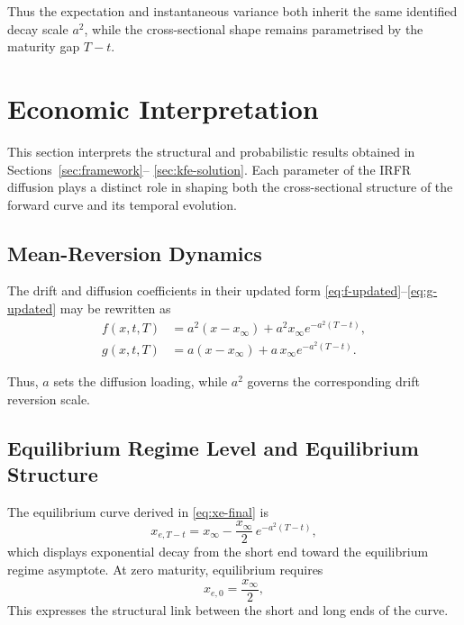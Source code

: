 \documentclass[12pt]{article}
\theoremstyle{statementstyle}
\begin{document}
Thus the expectation and instantaneous variance both inherit the same
identified decay scale \(a^{2}\), while the cross-sectional shape remains
parametrised by the maturity gap \(T-t\).
\section{Economic Interpretation}
\label{sec:econ}

This section interprets the structural and probabilistic results
obtained in Sections~\ref{sec:framework}--%
\ref{sec:kfe-solution}. Each parameter of the IRFR diffusion plays a
distinct role in shaping both the cross-sectional structure of the
forward curve and its temporal evolution.

\subsection{Mean-Reversion Dynamics}
\label{subsec:mean-reversion}

The drift and diffusion coefficients in their updated form
\eqref{eq:f-updated}--\eqref{eq:g-updated} may be rewritten as
\begin{align}
f(x,t,T)
&=
a^{2}(x - x_{\infty})
+
a^{2} x_{\infty} e^{-a^{2}(T-t)},
\tag{6.1.1}\label{eq:drift-interpretation}
\\[0.4em]
g(x,t,T)
&=
a(x - x_{\infty})
+
a\, x_{\infty} e^{-a^{2}(T-t)}.
\tag{6.1.2}\label{eq:stochastic-interpretation}
\end{align}

Thus, \(a\) sets the diffusion loading, while \(a^{2}\) governs the
corresponding drift reversion scale.

\subsection{Equilibrium Regime Level and Equilibrium Structure}
\label{subsec:equilibrium-structure}

The equilibrium curve derived in \eqref{eq:xe-final} is
\begin{equation}
x_{e,T-t}
=
x_{\infty}
-
\frac{x_{\infty}}{2}\, e^{-a^{2}(T-t)},
\tag{6.2.1}\label{eq:xe-equilibrium-interpretation}
\end{equation}
which displays exponential decay from the short end toward the
equilibrium regime asymptote. At zero maturity, equilibrium requires
\[
x_{e,0}=\frac{x_{\infty}}{2},
\]
This expresses the structural link between the short and long ends of
the curve.
\end{document}
